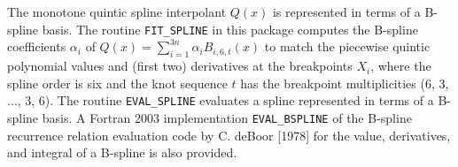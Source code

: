 
The monotone quintic spline interpolant $Q(x)$ is represented in terms of
a B-spline basis. The routine {\tt FIT\_SPLINE} in this package computes
the B-spline coefficients $\alpha_i$ of $Q(x)=\sum_{i=1}^{3n} \alpha_i
B_{i,6,t}(x)$ to match the piecewise quintic polynomial values and (first
two) derivatives at the breakpoints $X_i$, where the spline order is six
and the knot sequence $t$ has the breakpoint multiplicities (6, 3, $\ldots$,
3, 6).  The routine {\tt EVAL\_SPLINE} evaluates a spline represented in
terms of a B-spline basis. A Fortran 2003 implementation {\tt EVAL\_BSPLINE}
of the B-spline recurrence relation evaluation code by C. deBoor [1978]
for the value, derivatives, and integral of a B-spline is also provided.
